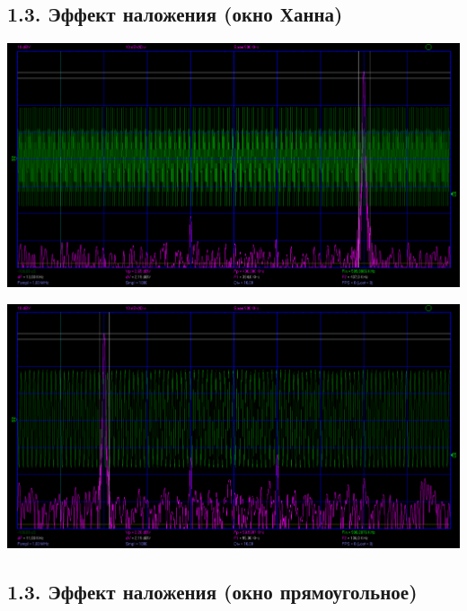 \documentclass[12pt,a4paper]{article}
\begin{document}
\subsection*{1.3. Эффект наложения (окно Ханна)}
\vspace*{20pt}

\begin{center}
	\includegraphics[width=.8\linewidth]{data/1-3_hanna_600KHZ}\hfill
\end{center}	
\begin{center}
	\includegraphics[width=.8\linewidth]{data/1-3_hanna_900KHZ}\hfill
\end{center}	

\newpage

\subsection*{1.3. Эффект наложения (окно прямоугольное)}
\vspace*{20pt}
\end{document}
